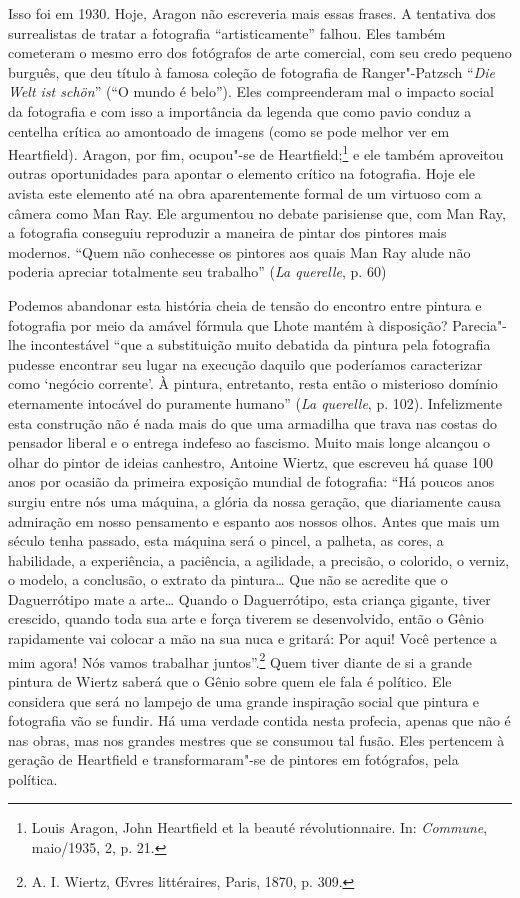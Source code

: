 Isso foi em 1930. Hoje, Aragon não escreveria mais essas frases. A
tentativa dos surrealistas de tratar a fotografia ``artisticamente''
falhou. Eles também cometeram o mesmo erro dos fotógrafos de arte
comercial, com seu credo pequeno burguês, que deu título à famosa
coleção de fotografia de Ranger"-Patzsch ``\emph{Die Welt ist schön}''
(``O mundo é belo''). Eles compreenderam mal o impacto social da
fotografia e com isso a importância da legenda que como pavio conduz a
centelha crítica ao amontoado de imagens (como se pode melhor ver em
Heartfield). Aragon, por fim, ocupou"-se de Heartfield;\footnote{Louis
  Aragon, John Heartfield et la beauté révolutionnaire. In: \emph{Commune},
  maio/1935, 2, p. 21.} e ele também aproveitou outras oportunidades
para apontar o elemento crítico na fotografia. Hoje ele avista este
elemento até na obra aparentemente formal de um virtuoso com a câmera
como Man Ray. Ele argumentou no debate parisiense que, com Man Ray, a
fotografia conseguiu reproduzir a maneira de pintar dos pintores mais
modernos. ``Quem não conhecesse os pintores aos quais Man Ray alude não
poderia apreciar totalmente seu trabalho'' (\emph{La querelle}, p. 60)

Podemos abandonar esta história cheia de tensão do encontro entre
pintura e fotografia por meio da amável fórmula que Lhote mantém à
disposição? Parecia"-lhe incontestável ``que a substituição muito
debatida da pintura pela fotografia pudesse encontrar seu lugar na
execução daquilo que poderíamos caracterizar como `negócio corrente'. À
pintura, entretanto, resta então o misterioso domínio eternamente
intocável do puramente humano'' (\emph{La querelle}, p. 102).
Infelizmente esta construção não é nada mais do que uma armadilha que
trava nas costas do pensador liberal e o entrega indefeso ao fascismo.
Muito mais longe alcançou o olhar do pintor de ideias canhestro, Antoine
Wiertz, que escreveu há quase 100 anos por ocasião da primeira exposição
mundial de fotografia: ``Há poucos anos surgiu entre nós uma máquina, a
glória da nossa geração, que diariamente causa admiração em nosso
pensamento e espanto aos nossos olhos. Antes que mais um século tenha
passado, esta máquina será o pincel, a palheta, as cores, a habilidade,
a experiência, a paciência, a agilidade, a precisão, o colorido, o
verniz, o modelo, a conclusão, o extrato da pintura\ldots{} Que não se
acredite que o Daguerrótipo mate a arte\ldots{} Quando o Daguerrótipo, esta
criança gigante, tiver crescido, quando toda sua arte e força tiverem se
desenvolvido, então o Gênio rapidamente vai colocar a mão na sua nuca e
gritará: Por aqui! Você pertence a mim agora! Nós vamos trabalhar
juntos''.\footnote{A. I. Wiertz, \OE vres littéraires, Paris, 1870, p. 309.}
Quem tiver diante de si a grande pintura de Wiertz saberá que o Gênio
sobre quem ele fala é político. Ele considera que será no lampejo de uma
grande inspiração social que pintura e fotografia vão se fundir. Há uma
verdade contida nesta profecia, apenas que não é nas obras, mas nos
grandes mestres que se consumou tal fusão. Eles pertencem à geração de
Heartfield e transformaram"-se de pintores em fotógrafos, pela política.

